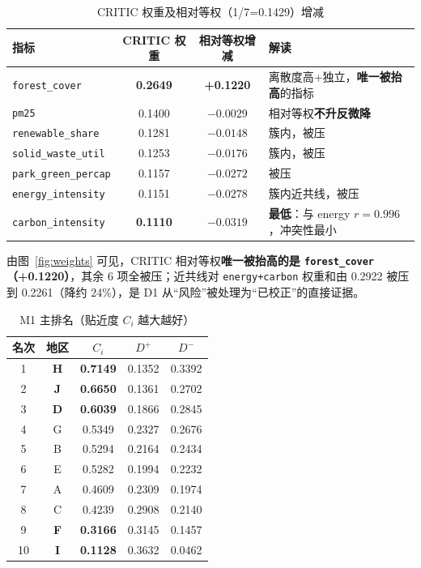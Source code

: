 \documentclass[12pt,a4paper]{ctexart}
\begin{document}
\begin{table}[htbp]\centering
\caption{CRITIC 权重及相对等权（1/7=0.1429）增减}
\begin{tabular}{lccl}
\toprule
指标 & CRITIC 权重 & 相对等权增减 & 解读 \\
\midrule
\texttt{forest\_cover} & \textbf{0.2649} & \textbf{+0.1220} & 离散度高+独立，\textbf{唯一被抬高}的指标 \\
\texttt{pm25} & 0.1400 & $-0.0029$ & 相对等权\textbf{不升反微降} \\
\texttt{renewable\_share} & 0.1281 & $-0.0148$ & 簇内，被压 \\
\texttt{solid\_waste\_util} & 0.1253 & $-0.0176$ & 簇内，被压 \\
\texttt{park\_green\_percap} & 0.1157 & $-0.0272$ & 被压 \\
\texttt{energy\_intensity} & 0.1151 & $-0.0278$ & 簇内近共线，被压 \\
\texttt{carbon\_intensity} & \textbf{0.1110} & $-0.0319$ & \textbf{最低}：与 energy $r=0.996$，冲突性最小 \\
\bottomrule
\end{tabular}
\end{table}

由图~\ref{fig:weights} 可见，CRITIC 相对等权\textbf{唯一被抬高的是 \texttt{forest\_cover}（+0.1220）}，其余 6 项全被压；近共线对 \texttt{energy+carbon} 权重和由 0.2922 被压到 0.2261（降约 24\%），是 D1 从``风险''被处理为``已校正''的直接证据。

\begin{table}[htbp]\centering
\caption{M1 主排名（贴近度 $C_i$ 越大越好）}
\begin{tabular}{ccccc}
\toprule
名次 & 地区 & $C_i$ & $D^+$ & $D^-$ \\
\midrule
1 & \textbf{H} & \textbf{0.7149} & 0.1352 & 0.3392 \\
2 & \textbf{J} & \textbf{0.6650} & 0.1361 & 0.2702 \\
3 & \textbf{D} & \textbf{0.6039} & 0.1866 & 0.2845 \\
4 & G & 0.5349 & 0.2327 & 0.2676 \\
5 & B & 0.5294 & 0.2164 & 0.2434 \\
6 & E & 0.5282 & 0.1994 & 0.2232 \\
7 & A & 0.4609 & 0.2309 & 0.1974 \\
8 & C & 0.4239 & 0.2908 & 0.2140 \\
9 & \textbf{F} & \textbf{0.3166} & 0.3145 & 0.1457 \\
10 & \textbf{I} & \textbf{0.1128} & 0.3632 & 0.0462 \\
\bottomrule
\end{tabular}
\end{table}
\end{document}
